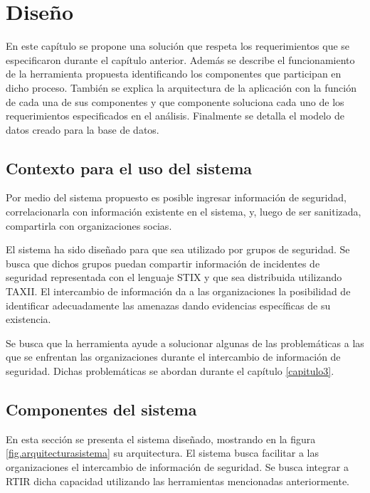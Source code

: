 \makeatother
\setlength\tabcolsep{1mm}
\renewcommand\arraystretch{1.3}
\renewcommand\theFigura{\arabic{FiguraCap4}}
\renewcommand\theTabla{\arabic{TablaCap4}}

\chapter{Diseño}
\label{capitulo4}
	En este capítulo se propone una solución que respeta los requerimientos que se especificaron
		durante el capítulo anterior. Además se describe el funcionamiento de la herramienta propuesta identificando los componentes que
		participan en dicho proceso. También se explica la arquitectura de la aplicación con la función de cada una de sus
		componentes y que componente soluciona cada uno de los requerimientos especificados en el análisis. Finalmente se detalla el modelo de datos creado para la base de datos.
	
	\section{Contexto para el uso del sistema} 
	Por medio del sistema propuesto es posible ingresar información de seguridad, correlacionarla
		con información existente en el sistema, y, luego de ser sanitizada, compartirla con organizaciones socias.
	
	
	\bigskip
	
	El sistema ha sido diseñado para que sea utilizado por grupos de seguridad. Se busca que
		dichos grupos puedan compartir información de incidentes de seguridad representada con el lenguaje STIX y que sea
		distribuida utilizando TAXII. El intercambio de información da a las organizaciones la posibilidad de identificar adecuadamente las
		amenazas dando evidencias específicas de su existencia.
	
	
	\bigskip
	
	Se busca que la herramienta ayude a solucionar algunas de las problemáticas a las que se
		enfrentan las organizaciones durante el intercambio de información de seguridad. Dichas problemáticas se abordan
		durante el capítulo \ref{capitulo3}.
	
	\section{Componentes del sistema}
	
	\bigskip
	
	En esta sección se presenta el sistema diseñado, mostrando en la figura \ref{fig.arquitecturasistema} su arquitectura. El sistema busca facilitar a las organizaciones el intercambio de información de seguridad. Se busca integrar a RTIR dicha capacidad utilizando las herramientas
		mencionadas anteriormente.
	

